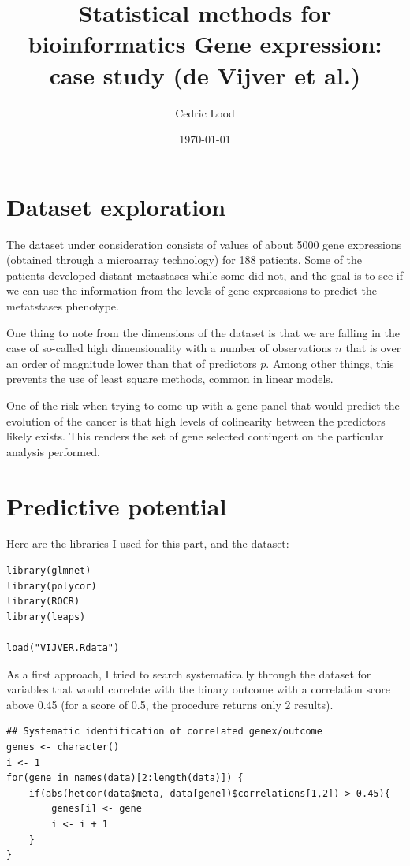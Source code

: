 \documentclass[11pt, a4paper]{article}
\title{Statistical methods for bioinformatics \linebreak Gene expression: case study (de Vijver et al.)}
\author{Cedric Lood}
\date{\today}
\begin{document}
\maketitle


\graphicspath{ {figures/} }
\setlength{\droptitle}{-5em} 
\setlength{\parindent}{0cm}

\section{Dataset exploration}
\label{sec-1}

The dataset under consideration consists of values of about 5000 gene
expressions (obtained through a microarray technology) for 188
patients. Some of the patients developed distant metastases while some
did not, and the goal is to see if we can use the information from the
levels of gene expressions to predict the metatstases phenotype.

One thing to note from the dimensions of the dataset is that we are
falling in the case of so-called high dimensionality with a number of
observations $n$ that is over an order of magnitude lower than that of
predictors $p$. Among other things, this prevents the use of least
square methods, common in linear models. 

One of the risk when trying to come up with a gene panel that would
predict the evolution of the cancer is that high levels of colinearity
between the predictors likely exists. This renders the set of gene
selected contingent on the particular analysis performed.
\section{Predictive potential}
\label{sec-2}

Here are the libraries I used for this part, and the dataset:

\begin{verbatim}
library(glmnet)
library(polycor)
library(ROCR)
library(leaps)

load("VIJVER.Rdata")
\end{verbatim}

As a first approach, I tried to search systematically through the
dataset for variables that would correlate with the binary outcome
with a correlation score above 0.45 (for a score of 0.5, the procedure
returns only 2 results).


\begin{verbatim}
## Systematic identification of correlated genex/outcome
genes <- character()
i <- 1
for(gene in names(data)[2:length(data)]) {
    if(abs(hetcor(data$meta, data[gene])$correlations[1,2]) > 0.45){
        genes[i] <- gene
        i <- i + 1
    }
}
\end{verbatim}
\end{document}
